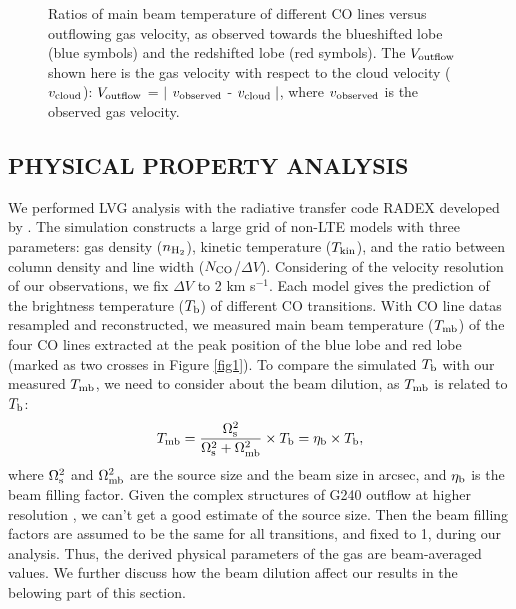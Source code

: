 \begin{figure}[tbp]
\caption{Ratios of main beam temperature of different CO lines versus outflowing gas velocity, as observed towards the blueshifted lobe (blue symbols) and the redshifted lobe (red symbols). The $V_{\textup{outflow}}$ shown here is the gas velocity with respect to the cloud velocity ($v_{\textup{cloud}}$): $V_{\textup{outflow}}$ = $\mid$ $v_{\textup{observed}}$ - $v_{\textup{cloud}}\mid$, where $v_{\textup{observed}}$ is the observed gas velocity. \label{fig2}}
\end{figure}

\subsection{PHYSICAL PROPERTY ANALYSIS}
We performed LVG analysis with the radiative transfer code RADEX developed by \citet{2007A&A...468..627V}. The simulation constructs a large grid of non-LTE models with three parameters: gas density ($n_{\textup{H}_2}$), kinetic temperature ($T_{\textup{kin}}$), and the ratio between column density and line width ($N_{\textup{CO}}$/$\Delta V$). Considering of the velocity resolution of our observations, we fix $\Delta V$ to 2 km s$^{-1}$. Each model gives the prediction of the brightness temperature ($T_\textup{b}$) of different CO transitions. With CO line datas resampled and reconstructed, we measured main beam temperature ($T_{\textup{mb}}$) of the four CO lines extracted at the peak position of the blue lobe and red lobe (marked as two crosses in Figure \ref{fig1}). To compare the simulated $T_\textup{b}$ with our measured $T_{\textup{mb}}$, we need to consider about the beam dilution, as $T_{\textup{mb}}$ is related to $T_\textup{b}$:
\begin{equation}
T_{\textup{mb}} = \frac{\Omega_{\textup{s}}^2}{\Omega_{\textup{s}}^2+\Omega_{\textup{mb}}^2}\times T_\textup{b} = \eta_{\textup{b}} \times T_\textup{b},
\end{equation}
where $\Omega_{\textup{s}}^2$ and $\Omega_{\textup{mb}}^2$ are the source size and the beam size in arcsec, and $\eta_{\textup{\textup{b}}}$ is the beam filling factor. Given the complex structures of G240 outflow at higher resolution \citep{2009ApJ...696...66Q}, we can't get a good estimate of the source size. Then the beam filling factors are assumed to be the same for all transitions, and fixed to 1, during our analysis. Thus, the derived physical parameters of the gas are beam-averaged values. We further discuss how the beam dilution affect our results in the belowing part of this section.

